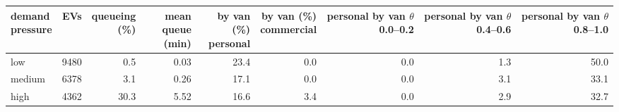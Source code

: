 \begin{tabular}{lrrrrrrrr}\toprule
\shortstack{demand\\pressure} & EVs & \shortstack{queueing\\(\%)} & \shortstack{mean queue\\(min)} & \shortstack{by van (\%)\\personal} & \shortstack{by van (\%)\\commercial} & \shortstack{personal by van\\$\theta$ 0.0--0.2} & \shortstack{personal by van\\$\theta$ 0.4--0.6} & \shortstack{personal by van\\$\theta$ 0.8--1.0} \\ \midrule
low & 9480 & 0.5 & 0.03 & 23.4 & 0.0 & 0.0 & 1.3 & 50.0 \\
medium & 6378 & 3.1 & 0.26 & 17.1 & 0.0 & 0.0 & 3.1 & 33.1 \\
high & 4362 & 30.3 & 5.52 & 16.6 & 3.4 & 0.0 & 2.9 & 32.7 \\
\bottomrule\end{tabular}
